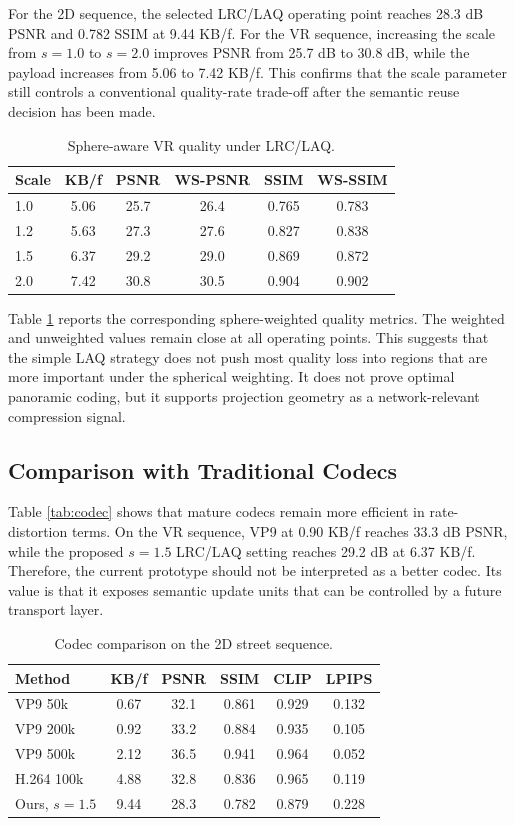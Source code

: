 \documentclass[conference]{IEEEtran}
\begin{document}
For the 2D sequence, the selected LRC/LAQ operating point reaches 28.3 dB PSNR and 0.782 SSIM at 9.44 KB/f. For the VR sequence, increasing the scale from $s=1.0$ to $s=2.0$ improves PSNR from 25.7 dB to 30.8 dB, while the payload increases from 5.06 to 7.42 KB/f. This confirms that the scale parameter still controls a conventional quality-rate trade-off after the semantic reuse decision has been made.

\begin{table}[t]
\caption{Sphere-aware VR quality under LRC/LAQ.}
\label{tab:ws}
\centering
\footnotesize
\begin{tabular}{lccccc}
\toprule
Scale & KB/f & PSNR & WS-PSNR & SSIM & WS-SSIM \\
\midrule
1.0 & 5.06 & 25.7 & 26.4 & 0.765 & 0.783 \\
1.2 & 5.63 & 27.3 & 27.6 & 0.827 & 0.838 \\
1.5 & 6.37 & 29.2 & 29.0 & 0.869 & 0.872 \\
2.0 & 7.42 & 30.8 & 30.5 & 0.904 & 0.902 \\
\bottomrule
\end{tabular}
\end{table}

Table \ref{tab:ws} reports the corresponding sphere-weighted quality metrics. The weighted and unweighted values remain close at all operating points. This suggests that the simple LAQ strategy does not push most quality loss into regions that are more important under the spherical weighting. It does not prove optimal panoramic coding, but it supports projection geometry as a network-relevant compression signal.

\subsection{Comparison with Traditional Codecs}

Table \ref{tab:codec} shows that mature codecs remain more efficient in rate-distortion terms. On the VR sequence, VP9 at 0.90 KB/f reaches 33.3 dB PSNR, while the proposed $s=1.5$ LRC/LAQ setting reaches 29.2 dB at 6.37 KB/f. Therefore, the current prototype should not be interpreted as a better codec. Its value is that it exposes semantic update units that can be controlled by a future transport layer.

\begin{table}[t]
\caption{Codec comparison on the 2D street sequence.}
\label{tab:codec2d}
\centering
\footnotesize
\begin{tabular}{lccccc}
\toprule
Method & KB/f & PSNR & SSIM & CLIP & LPIPS \\
\midrule
VP9 50k & 0.67 & 32.1 & 0.861 & 0.929 & 0.132 \\
VP9 200k & 0.92 & 33.2 & 0.884 & 0.935 & 0.105 \\
VP9 500k & 2.12 & 36.5 & 0.941 & 0.964 & 0.052 \\
H.264 100k & 4.88 & 32.8 & 0.836 & 0.965 & 0.119 \\
Ours, $s=1.5$ & 9.44 & 28.3 & 0.782 & 0.879 & 0.228 \\
\bottomrule
\end{tabular}
\end{table}
\end{document}
